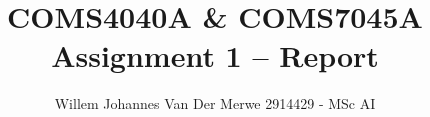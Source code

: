 

\title{COMS4040A \& COMS7045A Assignment 1 -- Report}
\author{Willem Johannes Van Der Merwe 2914429 - MSc AI}
\date{} 
\maketitle 
\pagestyle{fancy}
\fancyhf{}
\fancyhead[R]{\thepage}

\begingroup
  \let\clearpage\relax
  
\endgroup


\printbibliography 
 


